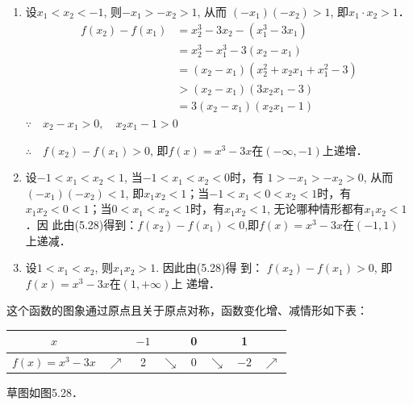 \begin{solution}
\begin{enumerate}
    \item 
设$x_1<x_2<-1$, 则$-x_1>-x_2>1$, 从而
$(-x_1)(-x_2)>1$,  即$x_1\cdot x_2>1$．
\begin{equation}
    \begin{split}
    f(x_2)-f(x_1)&=x_2^3-3x_2-(x_1^3-3x_1)\\
    &= x_2^3-x_1^3-3(x_2-x_1)\\
&=(x_2-x_1)(x_2^2+x_2x_1+x_1^2-3)\\
&>(x_2-x_1)(3x_2x_1-3)\\
&=3(x_2-x_1)(x_2x_1-1)
\end{split}
\end{equation}
$\because\quad x_2-x_1>0,\quad x_2x_1-1>0$

$\therefore\quad f(x_2)-f(x_1)>0$, 即$f(x)=x^3-3x$在$(-\infty,-1)$上递增．

\item 设$-1<x_1<x_2<1$, 当$-1<x_1<x_2<0$时，有
$1>-x_1>-x_2>0$,  从而$(-x_1)(-x_2)<1$, 即$x_1x_2<
1$；当$-1<x_1<0<x_2<1$时，有$x_1x_2<0<1$；当$0<x_1
<x_2<1$时，有$x_1x_2<1$, 无论哪种情形都有$x_1x_2<1$．因
此由(5.28)得到：$f(x_2)-f(x_1)<0$,即$f(x)=x^3-3x$在$(-1,1)$
上递减．

\item 设$1<x_1<x_2$, 则$x_1x_2>1$. 因此由(5.28)得
到：
$f(x_2)-f(x_1)>0$, 即$f(x)=x^3-3x$在$(1,+\infty)$上
递增．
\end{enumerate}

这个函数的图象通过原点且关于原点对称，函数变化增、减情形如下表：
\begin{center}
\begin{tabular}{c|ccccccc}
    \hline
    $x$    &&$-1$&& 0 && 1           \\
    \hline
    $f(x)=x^3-3x$& $\nearrow $&2&$\searrow $&0&$\searrow $&$-2$&$\nearrow$\\
    \hline
\end{tabular}
\end{center}
    
\end{solution}
    
草图如图5.28．
\begin{figure}[htp]
    \centering
{}    
    \caption{}
\end{figure}

